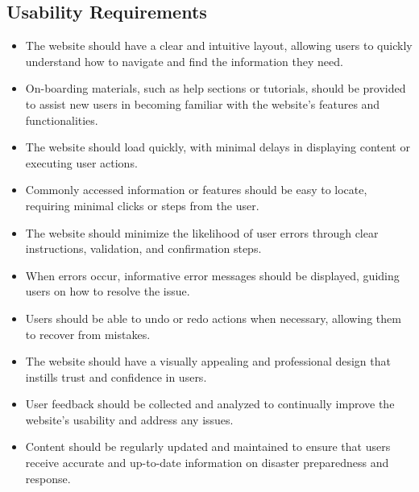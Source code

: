 \documentclass[11pt,a4paper]{article}
\begin{document}

\newpage

\subsection{Usability Requirements}

\begin{itemize}
    \item The website should have a clear and intuitive layout, allowing users to quickly understand how to navigate and find the information they need.
    \item On-boarding materials, such as help sections or tutorials, should be provided to assist new users in becoming familiar with the website's features and functionalities.
    \item The website should load quickly, with minimal delays in displaying content or executing user actions.
    \item Commonly accessed information or features should be easy to locate, requiring minimal clicks or steps from the user.
    
    \item The website should minimize the likelihood of user errors through clear instructions, validation, and confirmation steps.
    \item When errors occur, informative error messages should be displayed, guiding users on how to resolve the issue.
    \item Users should be able to undo or redo actions when necessary, allowing them to recover from mistakes.
    \item The website should have a visually appealing and professional design that instills trust and confidence in users.
    \item User feedback should be collected and analyzed to continually improve the website's usability and address any issues.
    \item Content should be regularly updated and maintained to ensure that users receive accurate and up-to-date information on disaster preparedness and response.
\end{itemize}
\end{document}
